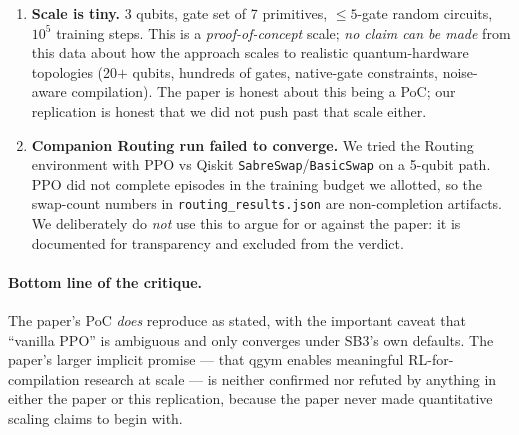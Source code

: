 \documentclass[11pt]{article}
\begin{document}
\begin{enumerate}
\item \textbf{Scale is tiny.} 3 qubits, gate set of 7 primitives,
$\le 5$-gate random circuits, $10^5$ training steps. This is a
\emph{proof-of-concept} scale; \emph{no claim can be made} from this data
about how the approach scales to realistic quantum-hardware topologies
(20$+$ qubits, hundreds of gates, native-gate constraints, noise-aware
compilation). The paper is honest about this being a PoC; our
replication is honest that we did not push past that scale either.

\item \textbf{Companion Routing run failed to converge.} We tried the
Routing environment with PPO vs Qiskit \texttt{SabreSwap}/\texttt{BasicSwap}
on a 5-qubit path. PPO did not complete episodes in the training budget
we allotted, so the swap-count numbers in \texttt{routing\_results.json}
are non-completion artifacts. We deliberately do \emph{not} use this to
argue for or against the paper: it is documented for transparency and
excluded from the verdict.
\end{enumerate}

\paragraph{Bottom line of the critique.} The paper's PoC \emph{does}
reproduce as stated, with the important caveat that ``vanilla PPO'' is
ambiguous and only converges under SB3's own defaults. The paper's larger
implicit promise --- that qgym enables meaningful RL-for-compilation
research at scale --- is neither confirmed nor refuted by anything in
either the paper or this replication, because the paper never made
quantitative scaling claims to begin with.


\end{document}
